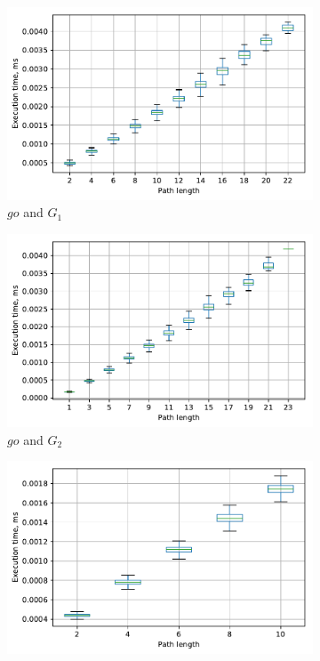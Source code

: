 \begin{figure}
\begin{subfigure}{0.32\textwidth}
\includegraphics[width=\linewidth,trim=0 0 -1.5cm 0]{plots/G1_go.pdf}
\caption{$go$ and $G_1$} \label{fig:extractTimeGoG1}
\end{subfigure}
\hspace*{\fill} %
\begin{subfigure}{0.32\textwidth}
\includegraphics[width=\linewidth,trim=0 0 -1.5cm 0]{plots/G2_go.pdf}
\caption{$go$ and $G_2$} \label{fig:extractTimeGoG2}
\end{subfigure}
\hspace*{\fill} %
\begin{subfigure}{0.32\textwidth}
\includegraphics[width=\linewidth,trim=0 0 -1.5cm 0]{plots/Geo_geospicies.pdf}

\end{subfigure}
\end{figure}
